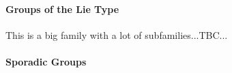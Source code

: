 



\paragraph{Groups of the Lie Type} This is a big family with a lot of subfamilies...TBC...


\paragraph{Sporadic Groups}










